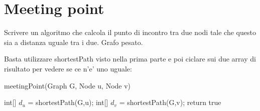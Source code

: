 \documentclass[oneside]{book}
\begin{document}
\section{Meeting point}
Scrivere un algoritmo che calcola il punto di incontro tra due nodi tale che questo sia a distanza uguale tra i due. Grafo pesato.

Basta utilizzare shortestPath visto nella prima parte e poi ciclare sui due array di risultato per vedere se ce n'e' uno uguale:

\begin{algorithm}
\caption{meetingPoint(Graph G, Node u, Node v)\label{cap:alg}}
\begin{algorithmic}
\State int[] $d_u$ = shortestPath(G,u);
\State int[] $d_v$ = shortestPath(G,v);
		\State return true
	\EndIf
\EndFor
\end{algorithmic}
\end{algorithm}
\end{document}
